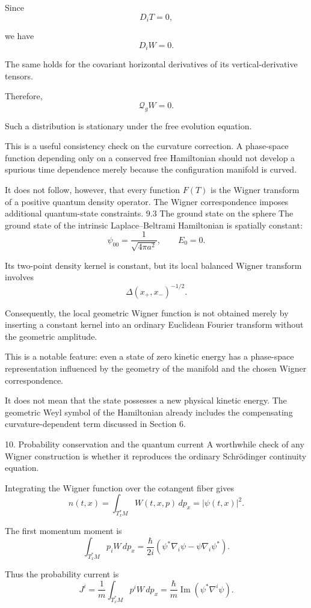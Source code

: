 Since
\[
D_iT=0,
\]

we have
\[
D_iW=0.
\]

The same holds for the covariant horizontal derivatives of its vertical-derivative tensors.

Therefore,
\[
\mathcal Q_gW=0.
\]

Such a distribution is stationary under the free evolution equation.

This is a useful consistency check on the curvature correction. A phase-space function depending only on a conserved free Hamiltonian should not develop a spurious time dependence merely because the configuration manifold is curved.

It does not follow, however, that every function \(F(T)\) is the Wigner transform of a positive quantum density operator. The Wigner correspondence imposes additional quantum-state constraints.
9.3 The ground state on the sphere
The ground state of the intrinsic Laplace–Beltrami Hamiltonian is spatially constant:
\[
\psi_{00}=\frac1{\sqrt{4\pi a^2}},
\qquad E_0=0.
\tag{72}
\]

Its two-point density kernel is constant, but its local balanced Wigner transform involves
\[
\Delta(x_+,x_-)^{-1/2}.
\]

Consequently, the local geometric Wigner function is not obtained merely by inserting a constant kernel into an ordinary Euclidean Fourier transform without the geometric amplitude.

This is a notable feature: even a state of zero kinetic energy has a phase-space representation influenced by the geometry of the manifold and the chosen Wigner correspondence.

It does not mean that the state possesses a new physical kinetic energy. The geometric Weyl symbol of the Hamiltonian already includes the compensating curvature-dependent term discussed in Section 6.

10. Probability conservation and the quantum current
A worthwhile check of any Wigner construction is whether it reproduces the ordinary Schrödinger continuity equation.

Integrating the Wigner function over the cotangent fiber gives
\[
\boxed{
n(t,x)=\int_{T_x^*M}W(t,x,p)\,dp_x
=|\psi(t,x)|^2.
}
\tag{73}
\]

The first momentum moment is
\[
\int_{T_x^*M}p_iW\,dp_x
=
\frac{\hbar}{2i}
\left(
\psi^*\nabla_i\psi
-\psi\nabla_i\psi^*
\right).
\tag{74}
\]

Thus the probability current is
\[
\boxed{
J^i=
\frac1m\int_{T_x^*M}p^iW\,dp_x
=
\frac{\hbar}{m}\operatorname{Im}
(\psi^*\nabla^i\psi).
}
\tag{75}
\]

